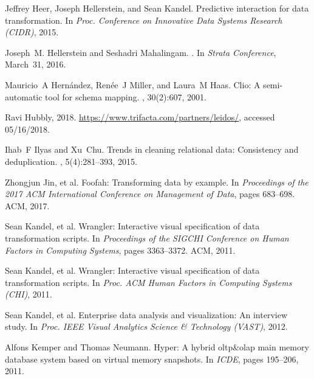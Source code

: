 \documentclass[11pt]{article}
\begin{document}
\begin{small}
\begin{thebibliography}{10}
Jeffrey Heer, Joseph Hellerstein, and Sean Kandel.
\newblock Predictive interaction for data transformation.
\newblock In {\em Proc. Conference on Innovative Data Systems Research (CIDR)},
  2015.

Joseph~M. Hellerstein and Seshadri Mahalingam.
.
\newblock In {\em Strata Conference}, March~31, 2016.

Mauricio~A Hern{\'a}ndez, Ren{\'e}e~J Miller, and Laura~M Haas.
\newblock Clio: A semi-automatic tool for schema mapping.
, 30(2):607, 2001.

Ravi Hubbly, 2018.
\newblock \url{https://www.trifacta.com/partners/leidos/}, accessed 05/16/2018.

Ihab~F Ilyas and Xu~Chu.
\newblock Trends in cleaning relational data: Consistency and deduplication.
,
  5(4):281--393, 2015.

Zhongjun Jin, et al. %
\newblock Foofah: Transforming data by example.
\newblock In {\em Proceedings of the 2017 ACM International Conference on
  Management of Data}, pages 683--698. ACM, 2017.

Sean Kandel, et al. %
\newblock Wrangler: Interactive visual specification of data transformation
  scripts.
\newblock In {\em Proceedings of the SIGCHI Conference on Human Factors in
  Computing Systems}, pages 3363--3372. ACM, 2011.

Sean Kandel, et al. %
\newblock Wrangler: Interactive visual specification of data transformation
  scripts.
\newblock In {\em Proc. ACM Human Factors in Computing Systems (CHI)}, 2011.

Sean Kandel, et al. %
\newblock Enterprise data analysis and visualization: An interview study.
\newblock In {\em Proc. IEEE Visual Analytics Science \& Technology (VAST)},
  2012.

Alfons Kemper and Thomas Neumann.
\newblock Hyper: A hybrid oltp\&olap main memory database system based on
  virtual memory snapshots.
\newblock In {\em ICDE}, pages 195--206, 2011.


\end{thebibliography}
\end{small}
\end{document}
